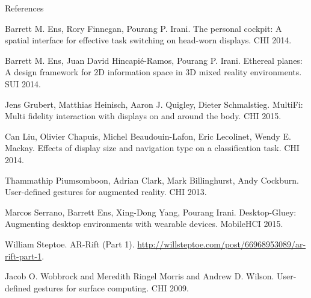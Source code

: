 \begin{frame}[allowframebreaks]{References}
  \begin{thebibliography}{10}
      Barrett M. Ens, Rory Finnegan, Pourang P. Irani.
      \newblock The personal cockpit: A spatial interface for effective task switching on head-worn displays.
      \newblock CHI 2014.
      
      Barrett M. Ens, Juan David Hincapié-Ramos, Pourang P. Irani.
      \newblock Ethereal planes: A design framework for 2D information space in 3D mixed reality environments.
      \newblock SUI 2014.

      Jens Grubert, Matthias Heinisch, Aaron J. Quigley, Dieter Schmalstieg.
      \newblock MultiFi: Multi fidelity interaction with displays on and around the body.
      \newblock CHI 2015.

      Can Liu, Olivier Chapuis, Michel Beaudouin-Lafon, Eric Lecolinet, Wendy E. Mackay.
      \newblock Effects of display size and navigation type on a classification task.
      \newblock CHI 2014.

      Thammathip Piumsomboon, Adrian Clark, Mark Billinghurst, Andy Cockburn.
      \newblock User-defined gestures for augmented reality.
      \newblock CHI 2013.

      Marcos Serrano, Barrett Ens, Xing-Dong Yang, Pourang Irani.
      \newblock Desktop-Gluey: Augmenting desktop environments with wearable devices.
      \newblock MobileHCI 2015.

      William Steptoe.
      \newblock AR-Rift (Part 1).
      \newblock \url{http://willsteptoe.com/post/66968953089/ar-rift-part-1}.

      Jacob O. Wobbrock and Meredith Ringel Morris and Andrew D. Wilson.
      \newblock User-defined gestures for surface computing.
      \newblock CHI 2009.
  \end{thebibliography}
\end{frame}